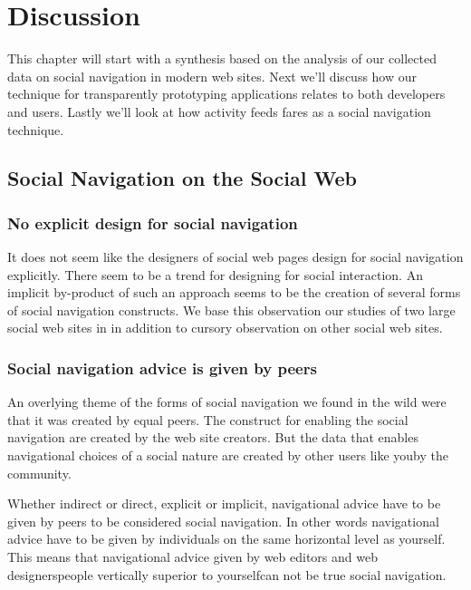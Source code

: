 \chapter{Discussion}
\label{chapter:discussion}

This chapter will start with a synthesis based on the analysis of our
collected data on social navigation in modern web sites.
Next we'll discuss how our technique for transparently prototyping
applications relates to both developers and users. Lastly we'll look at how
activity feeds fares as a social navigation technique.

\section{Social Navigation on the Social Web}

\subsection{No explicit design for social navigation}

It does not seem like the designers of social web pages design for social
navigation explicitly. There seem to be a trend for designing for social
interaction. An implicit by-product of such an approach seems to be
the creation of several forms of social navigation constructs.
We base this observation our studies of two large social web sites in
 in addition to cursory observation on other social web
sites.

\subsection{Social navigation advice is given by peers}

An overlying theme of the forms of social navigation we found in the wild were
that it was created by equal peers. The construct for enabling the social
navigation are created by the web site creators. But the data that
enables navigational choices of a social nature are created by other users
like you\dash{}by the community.

Whether indirect or direct, explicit or implicit, navigational advice have to
be given by peers to be considered social navigation. In other words
navigational advice have to be given by individuals on the same horizontal
level as yourself. This means that navigational advice given by web editors
and web designers\dash{}people vertically superior to yourself\dash{}can not
be true social navigation.

